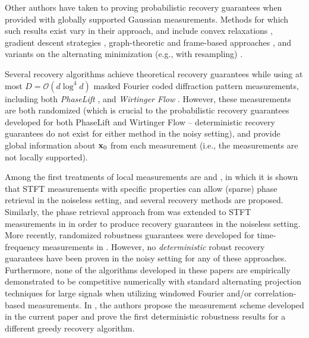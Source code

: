 Other authors have taken to proving probabilistic recovery guarantees when provided with globally supported Gaussian measurements.  Methods for which such results exist vary in their approach, and include convex relaxations \cite{candes2014solving,candes2012phaselift}, gradient descent strategies \cite{candes2015phase}, graph-theoretic  \cite{alexeev2014phase} and frame-based approaches \cite{balan2009painless, bodmann2013stable}, and variants on the alternating minimization (e.g., with resampling) \cite{netrapalli2013phase}.

Several recovery algorithms achieve theoretical recovery guarantees while using at most $D = \mathcal{O}(d \log^4 d)$ masked Fourier coded diffraction pattern measurements, including both {\em PhaseLift} \cite{Candes2014WF,gross2015improved}, and {\em Wirtinger Flow} \cite{candes2015phase}.  However, these measurements are both randomized (which is crucial to the probabilistic recovery guarantees developed for both PhaseLift and Wirtinger Flow -- deterministic recovery guarantees do not exist for either method in the noisy setting), and provide global information about $\mathbf x_0$ from each measurement (i.e., the measurements are not locally supported).

Among the first treatments of local measurements are \cite{BendoryE16,eldar2014sparse} and \cite{jaganathan2015stft}, in which it is shown that STFT measurements with specific properties can allow (sparse) phase retrieval in the noiseless setting, and several recovery methods are proposed.  Similarly, the phase retrieval approach from \cite{alexeev2014phase} was extended to STFT measurements in \cite{salanevich2015polarization} in order to produce recovery guarantees in the noiseless setting.  More recently, randomized robustness guarantees were developed for time-frequency measurements in \cite{salanevich2016polarization}.  However, no {\it deterministic} robust recovery guarantees have been proven in the noisy setting for any of these approaches.  Furthermore, none of the algorithms developed in these papers are empirically demonstrated to be competitive numerically with standard alternating projection techniques for large signals when utilizing windowed Fourier and/or correlation-based measurements.  In \cite{IVW2015_FastPhase}, the authors propose the measurement scheme developed in the current paper and prove the first deterministic robustness results for a different greedy recovery algorithm.

